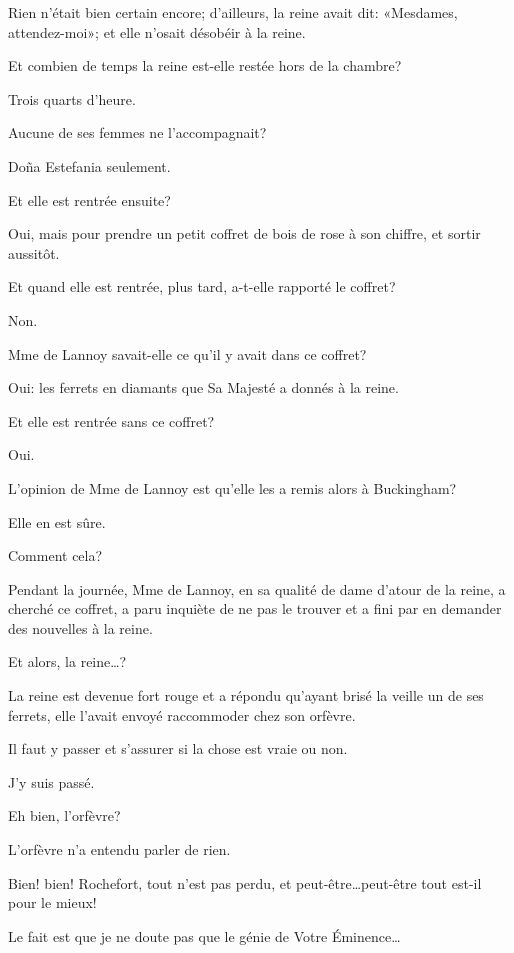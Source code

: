 \speak  Rien n'était bien certain encore; d'ailleurs, la reine avait dit: «Mesdames, attendez-moi»; et elle n'osait désobéir à la reine. 

\speak  Et combien de temps la reine est-elle restée hors de la chambre? 

\speak  Trois quarts d'heure. 

\speak  Aucune de ses femmes ne l'accompagnait? 

\speak  Doña Estefania seulement. 

\speak  Et elle est rentrée ensuite? 

\speak  Oui, mais pour prendre un petit coffret de bois de rose à son chiffre, et sortir aussitôt. 

\speak  Et quand elle est rentrée, plus tard, a-t-elle rapporté le coffret? 

\speak  Non. 

\speak  Mme de Lannoy savait-elle ce qu'il y avait dans ce coffret? 

\speak  Oui: les ferrets en diamants que Sa Majesté a donnés à la reine. 

\speak  Et elle est rentrée sans ce coffret? 

\speak  Oui. 

\speak  L'opinion de Mme de Lannoy est qu'elle les a remis alors à Buckingham? 

\speak  Elle en est sûre. 

\speak  Comment cela? 

\speak  Pendant la journée, Mme de Lannoy, en sa qualité de dame d'atour de la reine, a cherché ce coffret, a paru inquiète de ne pas le trouver et a fini par en demander des nouvelles à la reine. 

\speak  Et alors, la reine\dots? 

\speak  La reine est devenue fort rouge et a répondu qu'ayant brisé la veille un de ses ferrets, elle l'avait envoyé raccommoder chez son orfèvre. 

\speak  Il faut y passer et s'assurer si la chose est vraie ou non. 

\speak  J'y suis passé. 

\speak  Eh bien, l'orfèvre? 

\speak  L'orfèvre n'a entendu parler de rien. 

\speak  Bien! bien! Rochefort, tout n'est pas perdu, et peut-être\dots peut-être tout est-il pour le mieux! 

\speak  Le fait est que je ne doute pas que le génie de Votre Éminence\dots 


